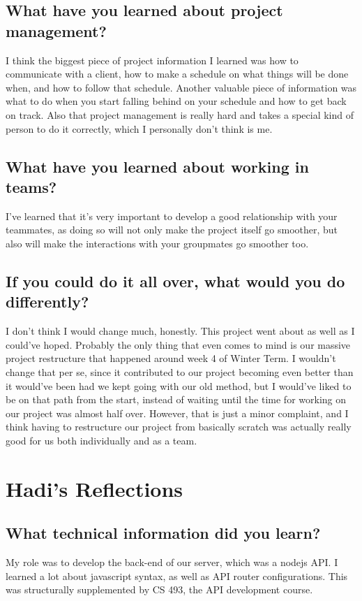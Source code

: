 \documentclass[onecolumn, draftclsnofoot,10pt, compsoc]{report}
\begin{document}
\subsection{What have you learned about project management?}
I think the biggest piece of project information I learned was how to communicate with a client, how to make a schedule on what things will be done when, and how to follow that schedule. Another valuable piece of information was what to do when you start falling behind on your schedule and how to get back on track. Also that project management is really hard and takes a special kind of person to do it correctly, which I personally don't think is me.
\subsection{What have you learned about working in teams?}
I've learned that it's very important to develop a good relationship with your teammates, as doing so will not only make the project itself go smoother, but also will make the interactions with your groupmates go smoother too.
\subsection{If you could do it all over, what would you do differently?}
I don't think I would change much, honestly. This project went about as well as I could've hoped. Probably the only thing that even comes to mind is our massive project restructure that happened around week 4 of Winter Term. I wouldn't change that per se, since it contributed to our project becoming even better than it would've been had we kept going with our old method, but I would've liked to be on that path from the start, instead of waiting until the time for working on our project was almost half over. However, that is just a minor complaint, and I think having to restructure our project from basically scratch was actually really good for us both individually and as a team.
\section{Hadi's Reflections}

\subsection{What technical information did you learn?}
My role was to develop the back-end of our server, which was a nodejs API. I learned a lot about javascript syntax, as well as API router configurations. This was structurally supplemented by CS 493, the API development course.
\end{document}
